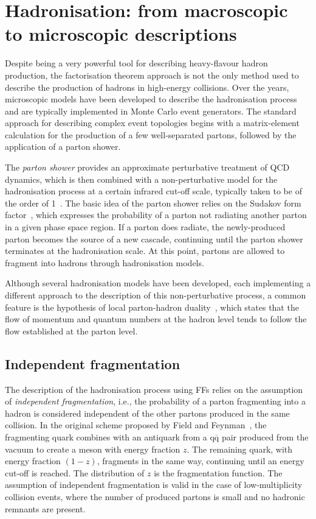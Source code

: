 \section{Hadronisation: from macroscopic to microscopic descriptions}
Despite being a very powerful tool for describing heavy-flavour hadron production, the factorisation theorem approach is not the only method used to describe the production of hadrons in high-energy collisions. Over the years, microscopic models have been developed to describe the hadronisation process and are typically implemented in Monte Carlo event generators. The standard approach for describing complex event topologies begins with a matrix-element calculation for the production of a few well-separated partons, followed by the application of a parton shower. 

The \emph{parton shower} provides an approximate perturbative treatment of QCD dynamics, which is then combined with a non-perturbative model for the hadronisation process at a certain infrared cut-off scale, typically taken to be of the order of 1~\gev. The basic idea of the parton shower relies on the Sudakov form factor~\cite{Sudakov:1954sw}, which expresses the probability of a parton not radiating another parton in a given phase space region. If a parton does radiate, the newly-produced parton becomes the source of a new cascade, continuing until the parton shower terminates at the hadronisation scale. At this point, partons are allowed to fragment into hadrons through hadronisation models. 

Although several hadronisation models have been developed, each implementing a different approach to the description of this non-perturbative process, a common feature is the hypothesis of local parton-hadron duality~\cite{Azimov:1984np}, which states that the flow of momentum and quantum numbers at the hadron level tends to follow the flow established at the parton level.

\subsection{Independent fragmentation}\label{sec:independent_fragmentation}
The description of the hadronisation process using FFs relies on the assumption of \emph{independent fragmentation}, i.e., the probability of a parton fragmenting into a hadron is considered independent of the other partons produced in the same collision. In the original scheme proposed by Field and Feynman~\cite{Field:1976ve}, the fragmenting quark combines with an antiquark from a $\mathrm{q\overline{q}}$ pair produced from the vacuum to create a meson with energy fraction $z$. The remaining quark, with energy fraction $(1-z)$, fragments in the same way, continuing until an energy cut-off is reached. The distribution of $z$ is the fragmentation function. The assumption of independent fragmentation is valid in the case of low-multiplicity \ee collision events, where the number of produced partons is small and no hadronic remnants are present.
